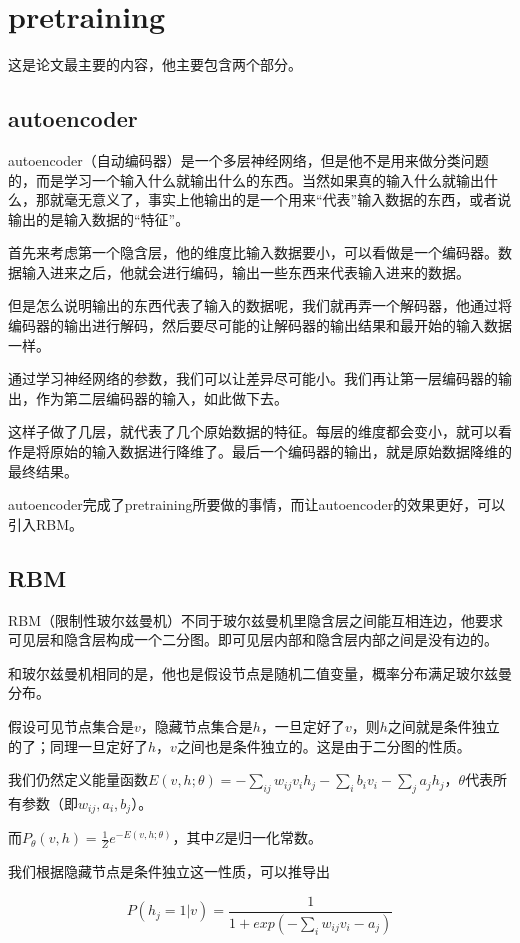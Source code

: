 \documentclass{ctexart}
\begin{document}
\section{pretraining}
这是论文最主要的内容，他主要包含两个部分。
\subsection{autoencoder}
autoencoder（自动编码器）是一个多层神经网络，但是他不是用来做分类问题的，而是学习一个输入什么就输出什么的东西。当然如果真的输入什么就输出什么，那就毫无意义了，事实上他输出的是一个用来“代表”输入数据的东西，或者说输出的是输入数据的“特征”。

首先来考虑第一个隐含层，他的维度比输入数据要小，可以看做是一个编码器。数据输入进来之后，他就会进行编码，输出一些东西来代表输入进来的数据。

但是怎么说明输出的东西代表了输入的数据呢，我们就再弄一个解码器，他通过将编码器的输出进行解码，然后要尽可能的让解码器的输出结果和最开始的输入数据一样。

通过学习神经网络的参数，我们可以让差异尽可能小。我们再让第一层编码器的输出，作为第二层编码器的输入，如此做下去。

这样子做了几层，就代表了几个原始数据的特征。每层的维度都会变小，就可以看作是将原始的输入数据进行降维了。最后一个编码器的输出，就是原始数据降维的最终结果。

autoencoder完成了pretraining所要做的事情，而让autoencoder的效果更好，可以引入RBM。
\subsection{RBM}
RBM（限制性玻尔兹曼机）不同于玻尔兹曼机里隐含层之间能互相连边，他要求可见层和隐含层构成一个二分图。即可见层内部和隐含层内部之间是没有边的。

和玻尔兹曼机相同的是，他也是假设节点是随机二值变量，概率分布满足玻尔兹曼分布。

假设可见节点集合是$v$，隐藏节点集合是$h$，一旦定好了$v$，则$h$之间就是条件独立的了；同理一旦定好了$h$，$v$之间也是条件独立的。这是由于二分图的性质。

我们仍然定义能量函数$E(v,h;\theta)=-\sum\limits_{ij}w_{ij}v_ih_j-\sum\limits_i b_i v_i-\sum\limits_j a_j h_j$，$\theta$代表所有参数（即$w_{ij},a_i,b_j$）。

而$P_{\theta}(v,h)=\frac{1}{Z}e^{-E(v,h;\theta)}$，其中$Z$是归一化常数。

我们根据隐藏节点是条件独立这一性质，可以推导出

\[P(h_j=1|v)=\frac{1}{1+exp(-\sum\limits_i w_{ij}v_i-a_j)}\]
\end{document}
